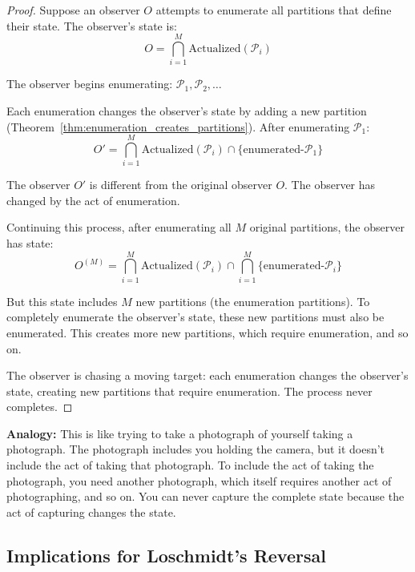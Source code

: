 \documentclass[twocolumn,10pt]{article}
\theoremstyle{definition}
\theoremstyle{remark}
\begin{document}
\begin{proof}
Suppose an observer $O$ attempts to enumerate all partitions that define their state. The observer's state is:
\begin{equation}
O = \bigcap_{i=1}^{M} \text{Actualized}(\mathcal{P}_i)
\end{equation}

The observer begins enumerating: $\mathcal{P}_1, \mathcal{P}_2, \ldots$

Each enumeration changes the observer's state by adding a new partition (Theorem~\ref{thm:enumeration_creates_partitions}). After enumerating $\mathcal{P}_1$:
\begin{equation}
O' = \bigcap_{i=1}^{M} \text{Actualized}(\mathcal{P}_i) \cap \{\text{enumerated-}\mathcal{P}_1\}
\end{equation}

The observer $O'$ is different from the original observer $O$. The observer has changed by the act of enumeration.

Continuing this process, after enumerating all $M$ original partitions, the observer has state:
\begin{equation}
O^{(M)} = \bigcap_{i=1}^{M} \text{Actualized}(\mathcal{P}_i) \cap \bigcap_{i=1}^{M} \{\text{enumerated-}\mathcal{P}_i\}
\end{equation}

But this state includes $M$ new partitions (the enumeration partitions). To completely enumerate the observer's state, these new partitions must also be enumerated. This creates more new partitions, which require enumeration, and so on.

The observer is chasing a moving target: each enumeration changes the observer's state, creating new partitions that require enumeration. The process never completes.
\end{proof}

\noindent\textbf{Analogy:} This is like trying to take a photograph of yourself taking a photograph. The photograph includes you holding the camera, but it doesn't include the act of taking that photograph. To include the act of taking the photograph, you need another photograph, which itself requires another act of photographing, and so on. You can never capture the complete state because the act of capturing changes the state.

\subsection{Implications for Loschmidt's Reversal}
\end{document}
